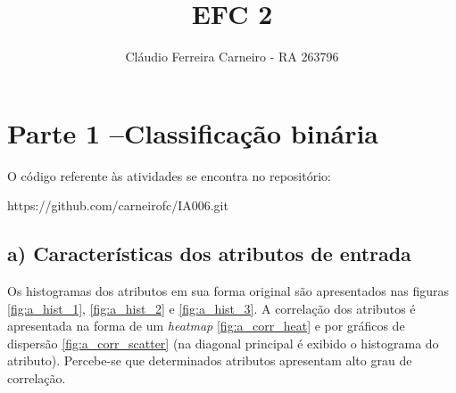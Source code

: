 \documentclass{article}
\author{Cláudio Ferreira Carneiro - RA 263796}
\title{EFC 2}
\begin{document}
    \maketitle
    \newpage
    \section[]{Parte 1 –Classificação binária}
    O código referente às atividades se encontra no repositório:
    
    https://github.com/carneirofc/IA006.git\linebreak
    \subsection[]{a) Características dos atributos de entrada}
        Os histogramas dos atributos em sua forma original são apresentados nas figuras \ref{fig:a_hist_1},
        \ref{fig:a_hist_2} e \ref{fig:a_hist_3}. A correlação dos atributos é apresentada
        na forma de um \textit{heatmap} \ref{fig:a_corr_heat} e por gráficos de dispersão \ref{fig:a_corr_scatter}
        (na diagonal principal é exibido o histograma do atributo).
        Percebe-se que determinados atributos apresentam alto grau de correlação.
        
\end{document}
